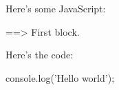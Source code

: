\documentclass[11pt,a4paper]{article}
\begin{document}
Here's some JavaScript:

\begin{code}
==> First block.
\end{code}

Here's the code:

\begin{code}[name=First block]
console.log('Hello world');
\end{code}
\end{document}
